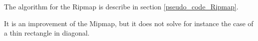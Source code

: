 The algorithm for the Ripmap is describe in section \ref{pseudo_code_Ripmap}.

It is an improvement of the Mipmap, but it does not solve for instance the case of a thin rectangle in diagonal.


